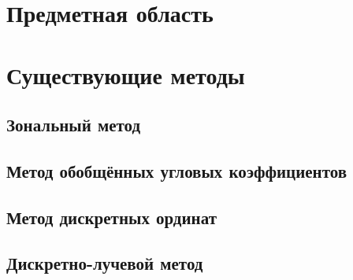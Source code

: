 \section{Предметная область}


\section{Существующие методы}

\subsection{Зональный метод}

\subsection{Метод обобщённых угловых коэффициентов}

\subsection{Метод дискретных ординат}

\subsection{Дискретно-лучевой метод}

